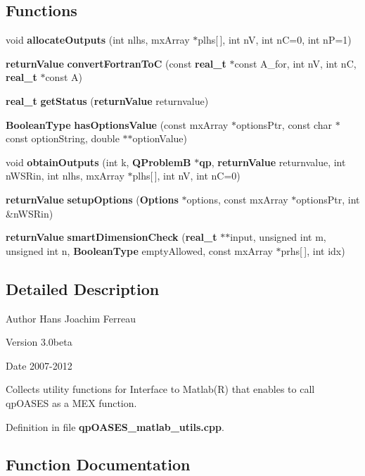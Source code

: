 \subsection*{Functions}
\begin{DoxyCompactItemize}
\item 
void {\bf allocateOutputs} (int nlhs, mxArray $\ast$plhs[$\,$], int nV, int nC=0, int nP=1)
\item 
{\bf returnValue} {\bf convertFortranToC} (const {\bf real\_\-t} $\ast$const A\_\-for, int nV, int nC, {\bf real\_\-t} $\ast$const A)
\item 
{\bf real\_\-t} {\bf getStatus} ({\bf returnValue} returnvalue)
\item 
{\bf BooleanType} {\bf hasOptionsValue} (const mxArray $\ast$optionsPtr, const char $\ast$const optionString, double $\ast$$\ast$optionValue)
\item 
void {\bf obtainOutputs} (int k, {\bf QProblemB} $\ast${\bf qp}, {\bf returnValue} returnvalue, int nWSRin, int nlhs, mxArray $\ast$plhs[$\,$], int nV, int nC=0)
\item 
{\bf returnValue} {\bf setupOptions} ({\bf Options} $\ast$options, const mxArray $\ast$optionsPtr, int \&nWSRin)
\item 
{\bf returnValue} {\bf smartDimensionCheck} ({\bf real\_\-t} $\ast$$\ast$input, unsigned int m, unsigned int n, {\bf BooleanType} emptyAllowed, const mxArray $\ast$prhs[$\,$], int idx)
\end{DoxyCompactItemize}


\subsection{Detailed Description}
\begin{DoxyAuthor}{Author}
Hans Joachim Ferreau 
\end{DoxyAuthor}
\begin{DoxyVersion}{Version}
3.0beta 
\end{DoxyVersion}
\begin{DoxyDate}{Date}
2007-\/2012
\end{DoxyDate}
Collects utility functions for Interface to Matlab(R) that enables to call qpOASES as a MEX function. 

Definition in file {\bf qpOASES\_\-matlab\_\-utils.cpp}.



\subsection{Function Documentation}
